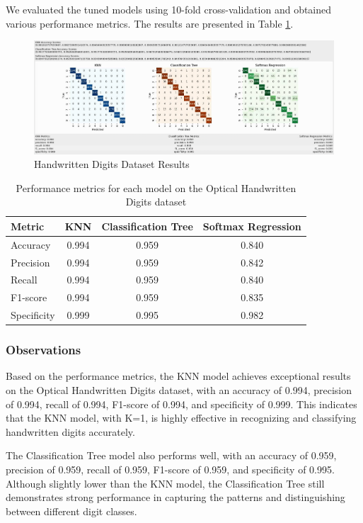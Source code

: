 \documentclass[letterpaper,10pt]{article}
\begin{document}
We evaluated the tuned models using 10-fold cross-validation and obtained various performance metrics. The results are presented in Table \ref{tab:digits_metrics}.
\begin{figure}[ht]
    \centering
    \includegraphics[width=1.0\textwidth]{pendigits_results.png}
    \caption{Handwritten Digits Dataset Results}
    \label{pendigits_results}
\end{figure}
\begin{table}[ht]
\centering
\caption{Performance metrics for each model on the Optical Handwritten Digits dataset}
\label{tab:digits_metrics}
\begin{tabular}{|l|c|c|c|}
\hline
\textbf{Metric} & \textbf{KNN} & \textbf{Classification Tree} & \textbf{Softmax Regression} \\
\hline
Accuracy & 0.994 & 0.959 & 0.840 \\
\hline
Precision & 0.994 & 0.959 & 0.842 \\
\hline
Recall & 0.994 & 0.959 & 0.840 \\
\hline
F1-score & 0.994 & 0.959 & 0.835 \\
\hline
Specificity & 0.999 & 0.995 & 0.982 \\
\hline
\end{tabular}
\end{table}

\subsubsection{Observations}

Based on the performance metrics, the KNN model achieves exceptional results on the Optical Handwritten Digits dataset, with an accuracy of 0.994, precision of 0.994, recall of 0.994, F1-score of 0.994, and specificity of 0.999. This indicates that the KNN model, with K=1, is highly effective in recognizing and classifying handwritten digits accurately.

The Classification Tree model also performs well, with an accuracy of 0.959, precision of 0.959, recall of 0.959, F1-score of 0.959, and specificity of 0.995. Although slightly lower than the KNN model, the Classification Tree still demonstrates strong performance in capturing the patterns and distinguishing between different digit classes.
\end{document}
